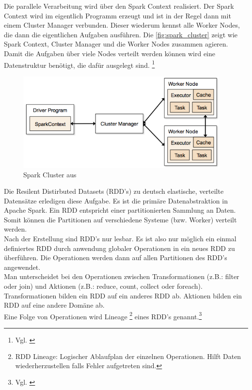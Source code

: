 \noindent
Die parallele Verarbeitung wird über den Spark Context realisiert. Der Spark Context wird im eigentlich Programm erzeugt und ist in der Regel dann mit einem Cluster Manager verbunden. Dieser wiederum kennst alle Worker Nodes, die dann die eigentlichen Aufgaben ausführen. Die \autoref{fig:spark_cluster} zeigt wie Spark Context, Cluster Manager und die Worker Nodes zusammen agieren. Damit die Aufgaben über viele Nodes verteilt werden können wird eine Datenstruktur benötigt, die dafür ausgelegt sind. \footnote{Vgl. \cite[101]{BDS16}}

\begin{figure}[h]
  \centering
  \includegraphics[width=\textwidth,height=50mm]{./bilder/cluster-overview.png}
  \caption{Spark Cluster aus \cite{SPCLUSTER}}\label{fig:spark_cluster}
\end{figure}



\noindent
Die Resilent Distirbuted Datasets (RDD's) zu deutsch elastische, verteilte Datensätze erledigen diese Aufgabe. Es ist die primäre Datenabstraktion in Apache Spark. 
Ein RDD entspricht einer partitionierten Sammlung an Daten. Somit können die Partitionen auf verschiedene Systeme (bzw. Worker) verteilt werden.  \\
Nach der Erstellung sind RDD's nur lesbar. Es ist also nur möglich ein einmal definiertes RDD durch anwendung globaler Operationen in ein neues RDD zu überführen. Die Operationen werden dann auf allen Partitionen des RDD's angewendet. \\
\noindent
Man unterscheidet bei den Operationen zwischen Transformationen (z.B.: filter oder join) und Aktionen (z.B.: reduce, count, collect oder foreach). Transformationen bilden ein RDD auf ein anderes RDD ab. Aktionen bilden ein RDD auf eine andere Domäne ab.\\ %
\noindent
Eine Folge von Operationen wird Lineage \footnote{RDD Lineage: Logischer Ablaufplan der einzelnen Operationen. Hilft Daten wiederherzustellen falls Fehler aufgetreten sind.} eines RDD's genannt.\footnote{Vgl. \cite{ZC+12}}



